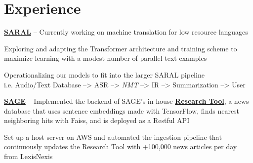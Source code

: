 \documentclass[letterpaper]{deedy-resume} %
\begin{document}
\begin{minipage}[t]{0.33\textwidth}
\sectionspace %


\end{minipage} %
\hfill
%
%
\begin{minipage}[t]{0.66\textwidth} %


\section{Experience}

\vspace{\topsep} %
\begin{tightitemize}
\item \href{https://viterbischool.usc.edu/news/2018/01/usc-isi-develop-translation-information-retrieval-system-uncommon-languages/}{\bf SARAL} -- Currently working on machine translation for low resource languages 
\item Exploring and adapting the Transformer architecture and training scheme to maximize learning with a modest number of parallel text examples
\item Operationalizing our models to fit into the larger SARAL pipeline \\
i.e. Audio/Text Database --> ASR --> {\it NMT} --> IR --> Summarization --> User
\item \href{https://sage-platform.isi.edu}{\bf SAGE} -- Implemented the backend of SAGE's in-house \href{http://54.153.12.18/research-tool/?referrer=rct&id=UXVlc3Rpb25Ob2RlOjMxMA==&token=eyJ0eXAiOiJKV1QiLCJhbGciOiJIUzI1NiJ9.eyJ1c2VyX2lkIjoxODExLCJ1c2VybmFtZSI6ImFkbWluIiwiZXhwIjoxNTYxODE3NTMzLCJlbWFpbCI6InNhZ2VAaXNpLmVkdSJ9.bFMd1C0R938hAJic-gzNEXTfI1bpZZW_VusjpXAommg}{\bf Research Tool}, a news database that uses sentence embeddings made with TensorFlow, finds nearest neighboring hits with Faiss, and is deployed as a Restful API
\item Set up a host server on AWS and automated the ingestion pipeline that continuously updates the Research Tool with +100,000 news articles per day from LexisNexis 
\end{tightitemize}



\end{minipage}
\end{document}

